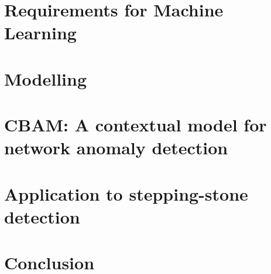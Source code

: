 \documentclass[a4paper,12pt,twoside]{report}
\begin{document}
%
%

\chapter{Requirements for Machine Learning}


\chapter{Modelling}


\chapter{CBAM: A contextual model for network anomaly detection}


\chapter{Application to stepping-stone detection}


\chapter{Conclusion}





\end{document}
